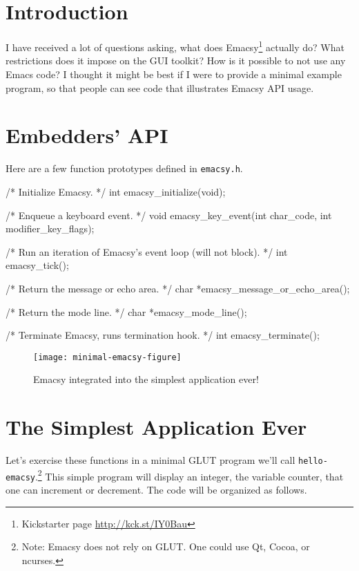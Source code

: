 \section{Introduction}%
I have received a lot of questions asking, what does
Emacsy\footnote{Kickstarter page \url{http://kck.st/IY0Bau}} actually do?  What
restrictions does it impose on the GUI toolkit?  How is it possible to
not use any Emacs code? I thought it might be best if I were to
provide a minimal example program, so that people can see code that
illustrates Emacsy API usage.  

\section{Embedders' API}

Here are a few function prototypes defined in \verb|emacsy.h|.

\endmoddef\nwstartdeflinemarkup\nwenddeflinemarkup
/* Initialize Emacsy. */
int  emacsy_initialize(void);

/* Enqueue a keyboard event. */
void emacsy_key_event(int char_code,
                      int modifier_key_flags);

/* Run an iteration of Emacsy's event loop 
   (will not block). */
int emacsy_tick(); 

/* Return the message or echo area. */
char *emacsy_message_or_echo_area();

/* Return the mode line. */
char *emacsy_mode_line();

/* Terminate Emacsy, runs termination hook. */
int  emacsy_terminate();
\nwendcode{}\nwdocspar

\begin{figure} 
  \centering
  \texttt{[image: minimal-emacsy-figure]} 
  \caption[Short Label]{\label{minimal-emacsy-figure}Emacsy
    integrated into the simplest application ever!}
\end{figure} 

\section{The Simplest Application Ever}
 
Let's exercise these functions in a minimal GLUT program we'll call
\verb|hello-emacsy|.\footnote{Note: Emacsy does not rely on GLUT. One
  could use Qt, Cocoa, or ncurses.}  This simple program will display
an integer, the variable {\Tt{}counter\nwendquote}, that one can increment or
decrement.  The code will be organized as follows.

